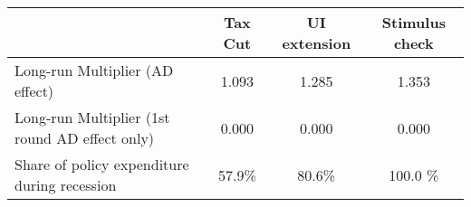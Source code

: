\begin{tabular}{@{}lccc@{}}
\toprule
& Tax Cut    & UI extension    & Stimulus check    \\  \midrule
Long-run Multiplier (AD effect) &1.093  & 1.285  & 1.353     \\
Long-run Multiplier (1st round AD effect only) &0.000  & 0.000  & 0.000     \\
Share of policy expenditure during recession &57.9\%  & 80.6\%  & 100.0 \%    \\
\end{tabular}
